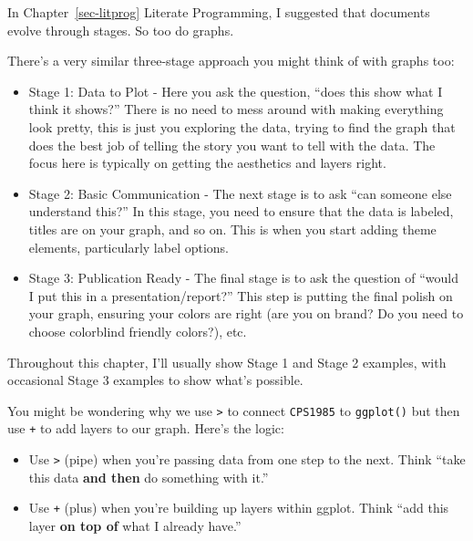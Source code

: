 \documentclass[
  letterpaper,
]{book}
\begin{document}
\begin{tcolorbox}[enhanced jigsaw, colframe=quarto-callout-tip-color-frame, breakable, arc=.35mm, bottomtitle=1mm, bottomrule=.15mm, colbacktitle=quarto-callout-tip-color!10!white, rightrule=.15mm, colback=white, opacityback=0, opacitybacktitle=0.6, coltitle=black, left=2mm, toptitle=1mm, toprule=.15mm, titlerule=0mm, leftrule=.75mm, title=\textcolor{quarto-callout-tip-color}{\faLightbulb}\hspace{0.5em}{Data Storytelling: The Three Stages of Graph Evolution}]

In Chapter~\ref{sec-litprog} Literate Programming, I suggested that
documents evolve through stages. So too do graphs.

There's a very similar three-stage approach you might think of with
graphs too:

\begin{itemize}
\item
  Stage 1: Data to Plot - Here you ask the question, ``does this show
  what I think it shows?'' There is no need to mess around with making
  everything look pretty, this is just you exploring the data, trying to
  find the graph that does the best job of telling the story you want to
  tell with the data. The focus here is typically on getting the
  aesthetics and layers right.
\item
  Stage 2: Basic Communication - The next stage is to ask ``can someone
  else understand this?'' In this stage, you need to ensure that the
  data is labeled, titles are on your graph, and so on. This is when you
  start adding theme elements, particularly label options.
\item
  Stage 3: Publication Ready - The final stage is to ask the question of
  ``would I put this in a presentation/report?'' This step is putting
  the final polish on your graph, ensuring your colors are right (are
  you on brand? Do you need to choose colorblind friendly colors?), etc.
\end{itemize}

Throughout this chapter, I'll usually show Stage 1 and Stage 2 examples,
with occasional Stage 3 examples to show what's possible.

\end{tcolorbox}

You might be wondering why we use \texttt{\textbar{}\textgreater{}} to
connect \texttt{CPS1985} to \texttt{ggplot()} but then use \texttt{+} to
add layers to our graph. Here's the logic:

\begin{itemize}
\item
  Use \texttt{\textbar{}\textgreater{}} (pipe) when you're passing data
  from one step to the next. Think ``take this data \textbf{and then} do
  something with it.''
\item
  Use \texttt{+} (plus) when you're building up layers within ggplot.
  Think ``add this layer \textbf{on top of} what I already have.''
\end{itemize}
\end{document}

